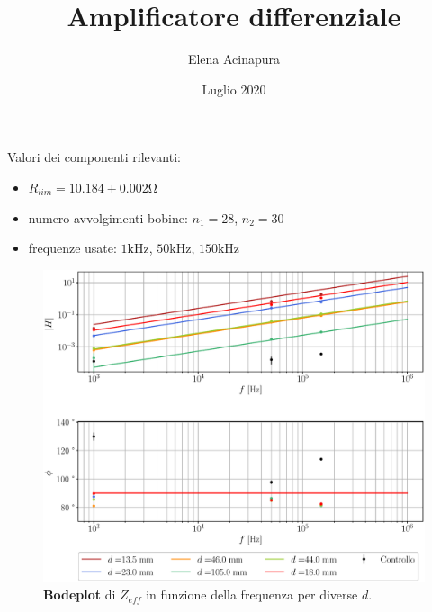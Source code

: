 \documentclass{article}
\title{Amplificatore differenziale}
\date{Luglio 2020}
\author{Elena Acinapura}
\begin{document}
\maketitle
Valori dei componenti rilevanti:
\begin{itemize}
    \item $R_{lim} = 10.184\pm0.002 \si{\ohm}$
    \item numero avvolgimenti bobine: $n_1 = 28$, $n_2 = 30$
    \item frequenze usate: $1\si{\kilo\hertz}$, $50\si{\kilo\hertz}$, $150\si{\kilo\hertz}$
\end{itemize}

\begin{figure}[h!]
    \centering
    \includegraphics[scale = 0.55]{Grafici/bode.eps}
    \caption{\textbf{Bodeplot} di $Z_{eff}$ in funzione della frequenza per diverse $d$.}
    \label{fig:bode}
\end{figure}
\end{document}
